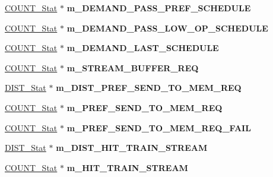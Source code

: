\begin{DoxyCompactItemize}
\item 
\hypertarget{classall__stats__c_ae20ff9ad0813873c11d8bf3a4ee79438}{
\hyperlink{classCOUNT__Stat}{COUNT\_\-Stat} $\ast$ {\bfseries m\_\-DEMAND\_\-PASS\_\-PREF\_\-SCHEDULE}}
\label{classall__stats__c_ae20ff9ad0813873c11d8bf3a4ee79438}

\item 
\hypertarget{classall__stats__c_abd7c1c34260c1c2b3af2603433ed02ca}{
\hyperlink{classCOUNT__Stat}{COUNT\_\-Stat} $\ast$ {\bfseries m\_\-DEMAND\_\-PASS\_\-LOW\_\-OP\_\-SCHEDULE}}
\label{classall__stats__c_abd7c1c34260c1c2b3af2603433ed02ca}

\item 
\hypertarget{classall__stats__c_a42f29e56cc96779bb2ecd45bed1278b5}{
\hyperlink{classCOUNT__Stat}{COUNT\_\-Stat} $\ast$ {\bfseries m\_\-DEMAND\_\-LAST\_\-SCHEDULE}}
\label{classall__stats__c_a42f29e56cc96779bb2ecd45bed1278b5}

\item 
\hypertarget{classall__stats__c_ac2767d478dbc36e57423bc633957fc61}{
\hyperlink{classCOUNT__Stat}{COUNT\_\-Stat} $\ast$ {\bfseries m\_\-STREAM\_\-BUFFER\_\-REQ}}
\label{classall__stats__c_ac2767d478dbc36e57423bc633957fc61}

\item 
\hypertarget{classall__stats__c_ac6525aec959309de6c1944a170ec0fc1}{
\hyperlink{classDIST__Stat}{DIST\_\-Stat} $\ast$ {\bfseries m\_\-DIST\_\-PREF\_\-SEND\_\-TO\_\-MEM\_\-REQ}}
\label{classall__stats__c_ac6525aec959309de6c1944a170ec0fc1}

\item 
\hypertarget{classall__stats__c_a40fc4516656c0956ad7916af03f31e5d}{
\hyperlink{classCOUNT__Stat}{COUNT\_\-Stat} $\ast$ {\bfseries m\_\-PREF\_\-SEND\_\-TO\_\-MEM\_\-REQ}}
\label{classall__stats__c_a40fc4516656c0956ad7916af03f31e5d}

\item 
\hypertarget{classall__stats__c_ab99943061e99601948efaadea6c19698}{
\hyperlink{classCOUNT__Stat}{COUNT\_\-Stat} $\ast$ {\bfseries m\_\-PREF\_\-SEND\_\-TO\_\-MEM\_\-REQ\_\-FAIL}}
\label{classall__stats__c_ab99943061e99601948efaadea6c19698}

\item 
\hypertarget{classall__stats__c_a175c2eb45600f81657f373e7ef186b2b}{
\hyperlink{classDIST__Stat}{DIST\_\-Stat} $\ast$ {\bfseries m\_\-DIST\_\-HIT\_\-TRAIN\_\-STREAM}}
\label{classall__stats__c_a175c2eb45600f81657f373e7ef186b2b}

\item 
\hypertarget{classall__stats__c_a90d87057bfd67c36745cb266a717fabf}{
\hyperlink{classCOUNT__Stat}{COUNT\_\-Stat} $\ast$ {\bfseries m\_\-HIT\_\-TRAIN\_\-STREAM}}
\label{classall__stats__c_a90d87057bfd67c36745cb266a717fabf}


\end{DoxyCompactItemize}
